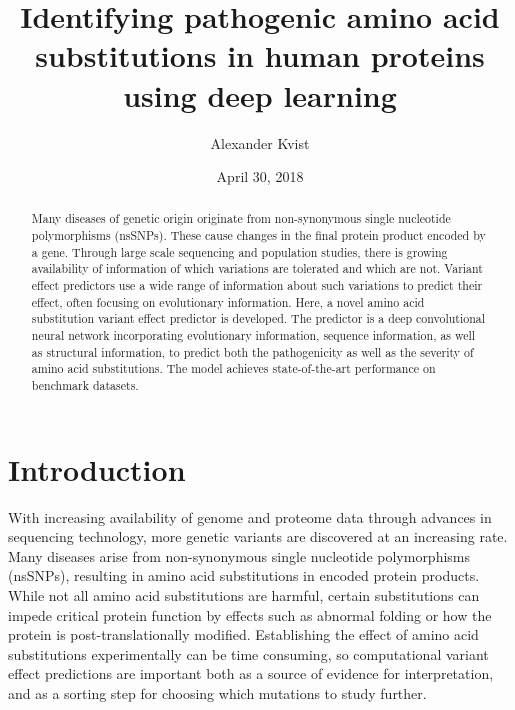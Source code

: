 \documentclass[11pt]{article}
\begin{document}

\title{Identifying pathogenic amino acid substitutions in human proteins using deep learning}
\date{April 30, 2018}
\author{Alexander Kvist}


\newpage
\mbox{}
\newpage
{}

\begin{abstract}

Many diseases of genetic origin originate from non-synonymous single nucleotide polymorphisms (nsSNPs). These cause changes in the final protein product encoded by a gene. Through large scale sequencing and population studies, there is growing availability of information of which variations are tolerated and which are not. Variant effect predictors use a wide range of information about such variations to predict their effect, often focusing on evolutionary information. Here, a novel amino acid substitution variant effect predictor is developed. The predictor is a deep convolutional neural network incorporating evolutionary information, sequence information, as well as structural information, to predict both the pathogenicity as well as the severity of amino acid substitutions. The model achieves state-of-the-art performance on benchmark datasets.

\end{abstract}
\newpage
\thispagestyle{empty}
\mbox{}
\newpage

\tableofcontents{}
\clearpage

\newpage
\thispagestyle{empty}
\mbox{}
\newpage


\section{Introduction}

With increasing availability of genome and proteome data through advances in sequencing technology, more genetic variants are discovered at an increasing rate. Many diseases arise from non-synonymous single nucleotide polymorphisms (nsSNPs), resulting in amino acid substitutions in encoded protein products. While not all amino acid substitutions are harmful, certain substitutions can impede critical protein function by effects such as abnormal folding or how the protein is post-translationally modified\cite{niroula2016variation}.
Establishing the effect of amino acid substitutions experimentally can be time consuming, so computational variant effect predictions are important both as a source of evidence for interpretation, and as a sorting step for choosing which mutations to study further.
\end{document}
